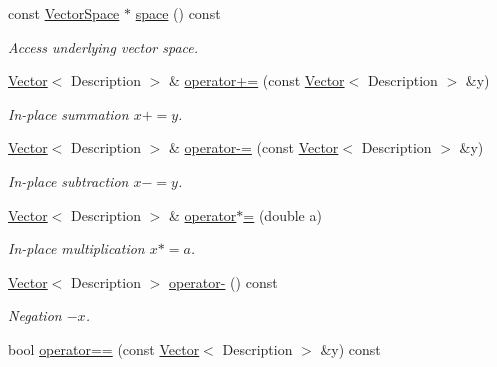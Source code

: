\begin{DoxyCompactItemize}
\item 
const \hyperlink{classSpacy_1_1VectorSpace}{Vector\+Space} $\ast$ \hyperlink{classSpacy_1_1VectorBase_a95e87ce98f5a7646055d4e87e6024044_a95e87ce98f5a7646055d4e87e6024044}{space} () const 
\begin{DoxyCompactList}\small\item\em Access underlying vector space. \end{DoxyCompactList}\item 
\hyperlink{classSpacy_1_1Kaskade_1_1Vector}{Vector}$<$ Description $>$ \& \hyperlink{classSpacy_1_1SupportedOperatorBase_a9d52829c0e1fcafab1f2a3de17379633_a9d52829c0e1fcafab1f2a3de17379633}{operator+=} (const \hyperlink{classSpacy_1_1Kaskade_1_1Vector}{Vector}$<$ Description $>$ \&y)
\begin{DoxyCompactList}\small\item\em In-\/place summation $ x+=y$. \end{DoxyCompactList}\item 
\hyperlink{classSpacy_1_1Kaskade_1_1Vector}{Vector}$<$ Description $>$ \& \hyperlink{classSpacy_1_1SupportedOperatorBase_af21496412c35e4afa59779b4fe1b67d5_af21496412c35e4afa59779b4fe1b67d5}{operator-\/=} (const \hyperlink{classSpacy_1_1Kaskade_1_1Vector}{Vector}$<$ Description $>$ \&y)
\begin{DoxyCompactList}\small\item\em In-\/place subtraction $ x-=y$. \end{DoxyCompactList}\item 
\hyperlink{classSpacy_1_1Kaskade_1_1Vector}{Vector}$<$ Description $>$ \& \hyperlink{classSpacy_1_1SupportedOperatorBase_a15adabb20b53d84a79982b0668a67f68_a15adabb20b53d84a79982b0668a67f68}{operator$\ast$=} (double a)
\begin{DoxyCompactList}\small\item\em In-\/place multiplication $ x*=a$. \end{DoxyCompactList}\item 
\hyperlink{classSpacy_1_1Kaskade_1_1Vector}{Vector}$<$ Description $>$ \hyperlink{classSpacy_1_1SupportedOperatorBase_a0adcaddc24efbbdccbd891df99971c6c_a0adcaddc24efbbdccbd891df99971c6c}{operator-\/} () const
\begin{DoxyCompactList}\small\item\em Negation $ -x$. \end{DoxyCompactList}\item 
bool \hyperlink{classSpacy_1_1SupportedOperatorBase_aa493a6ea82feb3480a1c83395a0a7c3a_aa493a6ea82feb3480a1c83395a0a7c3a}{operator==} (const \hyperlink{classSpacy_1_1Kaskade_1_1Vector}{Vector}$<$ Description $>$ \&y) const

\end{DoxyCompactItemize}
